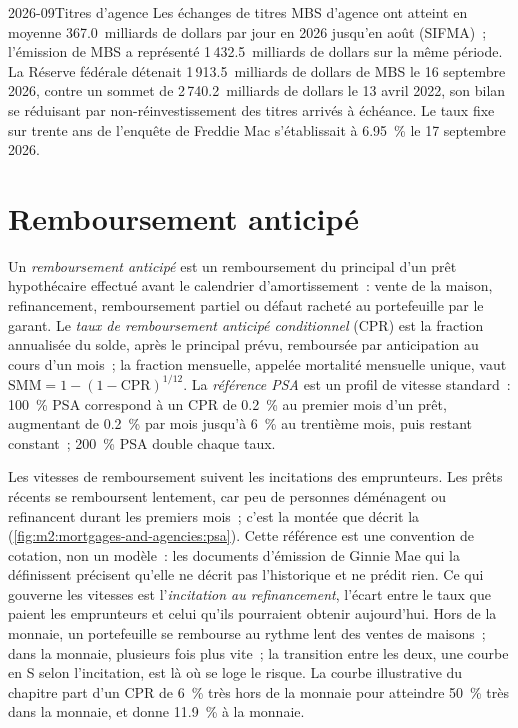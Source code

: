 \begin{dated}{2026-09}{Titres d'agence}\label{dat:m2:mortgages-and-agencies:market}
Les échanges de titres MBS d'agence ont atteint en moyenne 367.0~milliards de dollars par jour en 2026 jusqu'en août (SIFMA)~; l'émission de MBS
a représenté 1\,432.5~milliards de dollars sur la même période. La Réserve fédérale détenait
1\,913.5~milliards de dollars de MBS le 16 septembre 2026, contre un sommet de
2\,740.2~milliards de dollars le 13 avril 2022, son bilan se réduisant par non-réinvestissement des titres arrivés à échéance.
Le taux fixe sur trente ans de l'enquête de Freddie Mac s'établissait à 6.95~\% le 17
septembre 2026.
\end{dated}

\section{Remboursement anticipé}

\begin{definition}\label{def:m2:mortgages-and-agencies:cpr}
Un \emph{remboursement anticipé} est un remboursement du principal d'un prêt
hypothécaire effectué avant le calendrier d'amortissement~: vente de la maison, refinancement,
remboursement partiel ou défaut racheté au portefeuille par le garant. Le
\emph{taux de remboursement anticipé conditionnel} (CPR) est la fraction annualisée du solde,
après le principal prévu, remboursée par anticipation au cours d'un
mois~; la fraction mensuelle, appelée mortalité mensuelle unique, vaut
$\mathrm{SMM} = 1 - (1-\mathrm{CPR})^{1/12}$. La \emph{référence
PSA} est un profil de vitesse standard~: 100~\% PSA correspond à un CPR de
0.2~\% au premier mois d'un prêt, augmentant de 0.2~\% par mois
jusqu'à 6~\% au trentième mois, puis restant constant~; 200~\% PSA double chaque taux.
\end{definition}

Les vitesses de remboursement suivent les incitations des emprunteurs. Les prêts récents se
remboursent lentement, car peu de personnes déménagent ou refinancent durant les premiers mois~;
c'est la montée que décrit la  (\cref{fig:m2:mortgages-and-agencies:psa}).
Cette référence est une convention de cotation, non un modèle~: les documents d'émission de Ginnie Mae
qui la définissent précisent qu'elle ne décrit pas l'historique et ne prédit
rien. Ce qui gouverne les vitesses est l'\emph{incitation au refinancement}, l'écart
entre le taux que paient les emprunteurs et celui qu'ils pourraient obtenir aujourd'hui.
Hors de la monnaie, un portefeuille se rembourse au rythme lent des ventes de maisons~;
dans la monnaie, plusieurs fois plus vite~; la transition entre les deux, une courbe en S selon l'incitation,
est là où se loge le risque. La courbe illustrative du chapitre part d'un CPR de 6~\%
très hors de la monnaie pour atteindre 50~\% très dans la monnaie, et donne 11.9~\%
à la monnaie.

